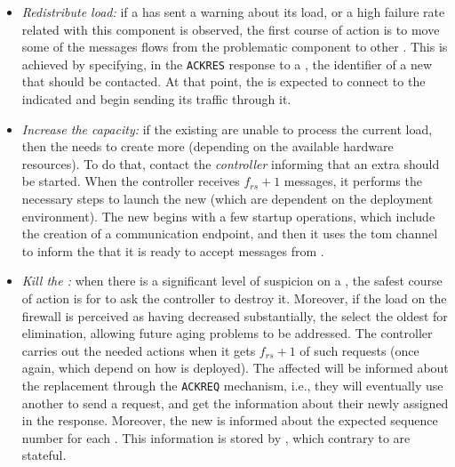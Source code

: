 \begin{itemize}


\item \emph{Redistribute load:} if a \presieve has sent a warning about its load, or a high failure rate related with this component is observed, the first course of action is to move some of the messages flows from the problematic component to other \presieve.
This is achieved by specifying, in the \texttt{ACKRES} response to a \sender, the identifier of a new \presieve that should be contacted.
At that point, the \sender is expected to connect to the indicated \presieve and begin sending its traffic through it.

\item \emph{Increase the \emph{\presieves} capacity:} if the existing \presieves are unable to process the current load, then the \sieveq needs to create more \presieves (depending on the available hardware resources).
To do that, \repsieves contact the \emph{controller} informing that an extra \presieve should be started.
When the controller receives $f_{rs} + 1$ messages, it performs the necessary steps to launch the new \presieve (which are dependent on the deployment environment).
The new \presieve begins with a few startup operations, which include the creation of a communication endpoint, and then it uses the \gls{tom} channel to inform the \repsieve that it is ready to accept messages from \senders.

\item \emph{Kill the \emph{\presieve}:} when there is a significant level of suspicion on a \presieve, the safest course of action is for \repsieves to ask the controller to destroy it.
Moreover, if the load on the firewall is perceived as having decreased substantially, the \repsieves select the oldest \presieve for elimination, allowing future aging problems to be addressed.
The controller carries out the needed actions when it gets $f_{rs} + 1$ of such requests (once again, which depend on how \sieveq is deployed).
The affected \senders will be informed about the \presieve replacement through the \texttt{ACKREQ} mechanism, i.e., they will eventually use another \presieve to send a request, and get the information about their newly assigned \presieve in the response.
Moreover, the new \presieve is informed about the expected sequence number for each \sender.
This information is stored by \repsieves, which contrary to \presieves are stateful.

\end{itemize}

